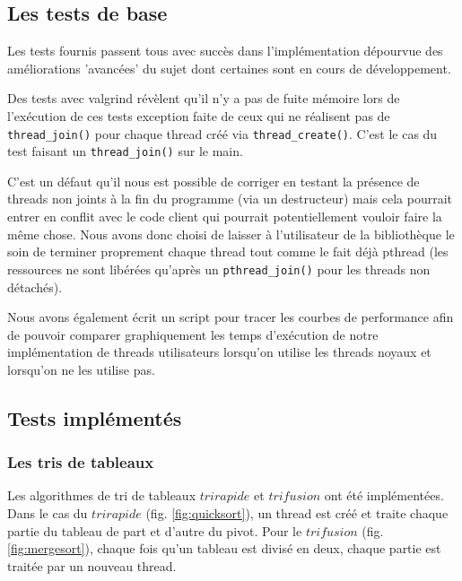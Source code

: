 \subsection{Les tests de base}

Les tests fournis passent tous avec succès dans l'implémentation dépourvue des
améliorations 'avancées' du sujet dont certaines sont en cours de
développement.

Des tests avec valgrind révèlent qu'il n'y a pas de fuite mémoire lors de
l'exécution de ces tests exception faite de ceux qui ne réalisent pas de
\verb!thread_join()! pour chaque thread créé via \verb!thread_create()!. C'est
le cas du test faisant un \verb!thread_join()! sur le main.

C'est un défaut qu'il nous est possible de corriger en testant la présence de
threads non joints à la fin du programme (via un destructeur) mais cela pourrait
entrer en conflit avec le code client qui pourrait potentiellement vouloir
faire la même chose. Nous avons donc choisi de laisser à l'utilisateur de la
bibliothèque le soin de terminer proprement chaque thread tout comme le fait
déjà pthread (les ressources ne sont libérées qu'après un \verb!pthread_join()!
pour les threads non détachés).

Nous avons également écrit un script pour tracer les courbes de performance
afin de pouvoir comparer graphiquement les temps d'exécution de notre
implémentation de threads utilisateurs lorsqu'on utilise les threads noyaux
et lorsqu'on ne les utilise pas.

\subsection{Tests implémentés}

\subsubsection{Les tris de tableaux} Les algorithmes de tri de tableaux $tri
rapide$ et $tri fusion$ ont été implémentées. Dans le cas du $tri rapide$
(fig. \ref{fig:quicksort}), un thread est créé et traite chaque partie du
tableau de part et d'autre du pivot. Pour le $tri fusion$
(fig. \ref{fig:mergesort}), chaque fois qu'un tableau est divisé en deux,
chaque partie est traitée par un nouveau thread.\\

